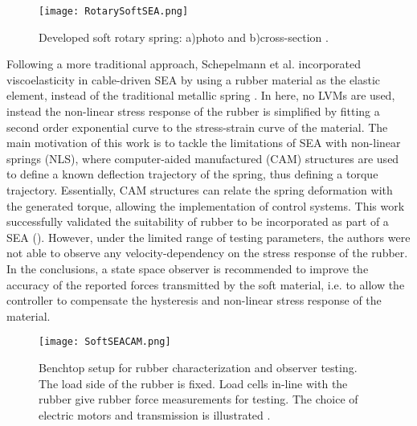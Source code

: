 \begin{figure}[htb!]
	\centering
	\texttt{[image: RotarySoftSEA.png]}
	\caption[Developed soft rotary spring: (a)photo and (b)cross-section.]{Developed soft rotary spring: a)photo and b)cross-section \cite{rollinson2013design}.}
	\label{fig:rotarySoftSEA}
\end{figure}

Following a more traditional approach, Schepelmann et al. incorporated viscoelasticity in cable-driven SEA by using a rubber material as the elastic element, instead of the traditional metallic spring \cite{schepelmann2014compact}. In here, no LVMs are used, instead the non-linear stress response of the rubber is simplified by fitting a second order exponential curve to the stress-strain curve of the material. The main motivation of this work is to tackle the limitations of SEA with non-linear springs (NLS), where computer-aided manufactured (CAM) structures are used to define a known deflection trajectory of the spring, thus defining a torque trajectory. Essentially, CAM structures can relate the spring deformation with the generated torque, allowing the implementation of control systems. This work successfully validated the suitability of rubber to be incorporated as part of a SEA (). However, under the limited range of testing parameters, the authors were not able to observe any velocity-dependency on the stress response of the rubber. In the conclusions, a state space observer is recommended to improve the accuracy of the reported forces transmitted by the soft material, i.e. to allow the controller to compensate the hysteresis and non-linear stress response of the material.

\begin{figure}[htb!]
	\centering
	\texttt{[image: SoftSEACAM.png]}
	\caption[Benchtop setup for rubber characterization and observer testing. The load side of the rubber is fixed. Load cells in-line with the rubber give rubber force measurements for testing. The choice of electric motors and transmission is illustrated.]{Benchtop setup for rubber characterization and observer testing. The load side of the rubber is fixed. Load cells in-line with the rubber give rubber force measurements for testing. The choice of electric motors and transmission is illustrated \cite{schepelmann2014compact}.}
	\label{fig:softSEACAM}
\end{figure}

